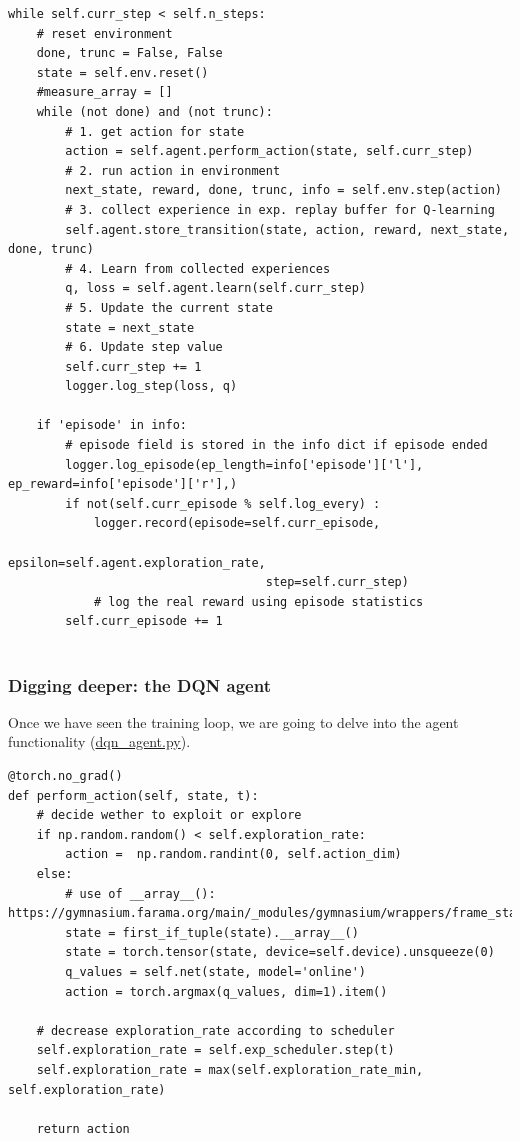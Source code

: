 \begin{lstlisting}[caption={Trainer main loop}, label={code:trainer_main_loop}]
while self.curr_step < self.n_steps:
	# reset environment
	done, trunc = False, False
	state = self.env.reset()
	#measure_array = []
	while (not done) and (not trunc):
		# 1. get action for state
		action = self.agent.perform_action(state, self.curr_step)  
		# 2. run action in environment
		next_state, reward, done, trunc, info = self.env.step(action) 
		# 3. collect experience in exp. replay buffer for Q-learning
		self.agent.store_transition(state, action, reward, next_state, done, trunc) 
		# 4. Learn from collected experiences
		q, loss = self.agent.learn(self.curr_step)
		# 5. Update the current state 
		state = next_state
		# 6. Update step value 
		self.curr_step += 1            
		logger.log_step(loss, q)

	if 'episode' in info:
		# episode field is stored in the info dict if episode ended
		logger.log_episode(ep_length=info['episode']['l'], ep_reward=info['episode']['r'],)
		if not(self.curr_episode % self.log_every) :
			logger.record(episode=self.curr_episode, 
									epsilon=self.agent.exploration_rate, 
									step=self.curr_step)
			# log the real reward using episode statistics
		self.curr_episode += 1
	
\end{lstlisting}

\subsubsection{Digging deeper: the DQN agent}
\label{sec:digging_dqn_agent}

Once we have seen the training loop, we are going to delve into the agent functionality (\href{https://github.com/Javimh18/DL_TFM/blob/main/src/agents/dqn_agent.py}{dqn\_agent.py}). 

\begin{lstlisting}[caption={Perform action method from the DQN Agent}, label={code:ex_action}]
@torch.no_grad()
def perform_action(self, state, t):
	# decide wether to exploit or explore
	if np.random.random() < self.exploration_rate:
		action =  np.random.randint(0, self.action_dim)
	else:
		# use of __array__(): https://gymnasium.farama.org/main/_modules/gymnasium/wrappers/frame_stack/
		state = first_if_tuple(state).__array__()
		state = torch.tensor(state, device=self.device).unsqueeze(0)
		q_values = self.net(state, model='online')
		action = torch.argmax(q_values, dim=1).item()
	
	# decrease exploration_rate according to scheduler
	self.exploration_rate = self.exp_scheduler.step(t)
	self.exploration_rate = max(self.exploration_rate_min, self.exploration_rate)
	
	return action
\end{lstlisting}

